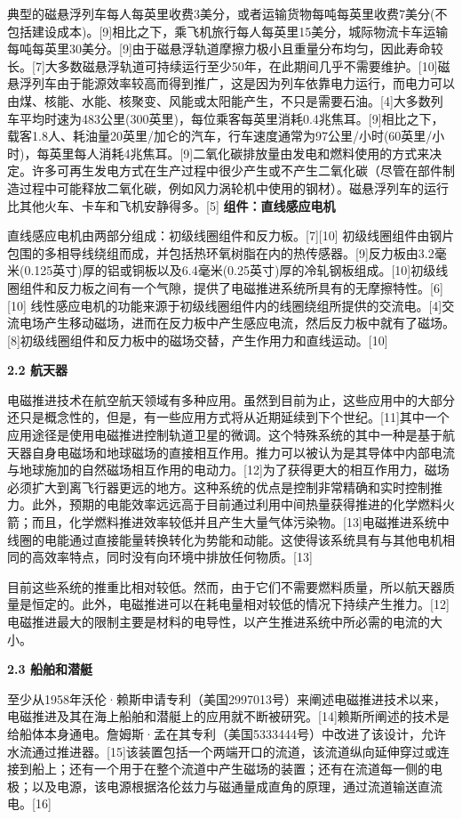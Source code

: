 典型的磁悬浮列车每人每英里收费3美分，或者运输货物每吨每英里收费7美分(不包括建设成本)。[9]相比之下，乘飞机旅行每人每英里15美分，城际物流卡车运输每吨每英里30美分。[9]由于磁悬浮轨道摩擦力极小且重量分布均匀，因此寿命较长。[7]大多数磁悬浮轨道可持续运行至少50年，在此期间几乎不需要维护。[10]磁悬浮列车由于能源效率较高而得到推广，这是因为列车依靠电力运行，而电力可以由煤、核能、水能、核聚变、风能或太阳能产生，不只是需要石油。[4]大多数列车平均时速为483公里(300英里)，每位乘客每英里消耗0.4兆焦耳。[9]相比之下，载客1.8人、耗油量20英里/加仑的汽车，行车速度通常为97公里/小时(60英里/小时)，每英里每人消耗4兆焦耳。[9]二氧化碳排放量由发电和燃料使用的方式来决定。许多可再生发电方式在生产过程中很少产生或不产生二氧化碳（尽管在部件制造过程中可能释放二氧化碳，例如风力涡轮机中使用的钢材）。磁悬浮列车的运行比其他火车、卡车和飞机安静得多。[5]\textbf{ 组件：直线感应电机} 

直线感应电机由两部分组成：初级线圈组件和反力板。[7][10] 初级线圈组件由钢片包围的多相导线绕组而成，并包括热环氧树脂在内的热传感器。[9]反力板由3.2毫米(0.125英寸)厚的铝或铜板以及6.4毫米(0.25英寸)厚的冷轧钢板组成。[10]初级线圈组件和反力板之间有一个气隙，提供了电磁推进系统所具有的无摩擦特性。[6][10] 线性感应电机的功能来源于初级线圈组件内的线圈绕组所提供的交流电。[4]交流电场产生移动磁场，进而在反力板中产生感应电流，然后反力板中就有了磁场。[8]初级线圈组件和反力板中的磁场交替，产生作用力和直线运动。[10]

\textbf{2.2 航天器}

电磁推进技术在航空航天领域有多种应用。虽然到目前为止，这些应用中的大部分还只是概念性的，但是，有一些应用方式将从近期延续到下个世纪。[11]其中一个应用途径是使用电磁推进控制轨道卫星的微调。这个特殊系统的其中一种是基于航天器自身电磁场和地球磁场的直接相互作用。推力可以被认为是其导体中内部电流与地球施加的自然磁场相互作用的电动力。[12]为了获得更大的相互作用力，磁场必须扩大到离飞行器更远的地方。这种系统的优点是控制非常精确和实时控制推力。此外，预期的电能效率远远高于目前通过利用中间热量获得推进的化学燃料火箭；而且，化学燃料推进效率较低并且产生大量气体污染物。[13]电磁推进系统中线圈的电能通过直接能量转换转化为势能和动能。这使得该系统具有与其他电机相同的高效率特点，同时没有向环境中排放任何物质。[13]

目前这些系统的推重比相对较低。然而，由于它们不需要燃料质量，所以航天器质量是恒定的。此外，电磁推进可以在耗电量相对较低的情况下持续产生推力。[12]电磁推进最大的限制主要是材料的电导性，以产生推进系统中所必需的电流的大小。

\textbf{2.3 船舶和潜艇}

至少从1958年沃伦·赖斯申请专利（美国2997013号）来阐述电磁推进技术以来，电磁推进及其在海上船舶和潜艇上的应用就不断被研究。[14]赖斯所阐述的技术是给船体本身通电。詹姆斯·孟在其专利（美国5333444号）中改进了该设计，允许水流通过推进器。[15]该装置包括一个两端开口的流道，该流道纵向延伸穿过或连接到船上；还有一个用于在整个流道中产生磁场的装置；还有在流道每一侧的电极；以及电源，该电源根据洛伦兹力与磁通量成直角的原理，通过流道输送直流电。[16]

